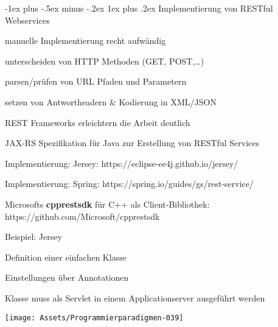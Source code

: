 \documentclass[10pt]{article}
\makeatletter
\renewcommand{\subsubsection}{\@startsection{subsubsection}{3}{0mm}%
                                {-1ex plus -.5ex minus -.2ex}%
                                {1ex plus .2ex}%
                                {\normalfont\small\bfseries}}
\makeatother
\begin{document}
\begin{itemize*}
\subsubsection{Implementierung von RESTful Webservices}
\begin{itemize*}
  \item manuelle Implementierung recht aufwändig
  \begin{itemize*}
    \item unterscheiden von HTTP Methoden (GET, POST,…)
    \item parsen/prüfen von URL Pfaden und Parametern
    \item setzen von Antwortheadern \& Kodierung in XML/JSON
  \end{itemize*}
  \item REST Frameworks erleichtern die Arbeit deutlich
  \begin{itemize*}
    \item JAX-RS Spezifikation für Java zur Erstellung von RESTful Services
    \begin{itemize*}
      \item Implementierung: Jersey: https://eclipse-ee4j.github.io/jersey/
      \item Implementierung: Spring:
      https://spring.io/guides/gs/rest-service/
    \end{itemize*}
    \item Microsofts \textbf{cpprestsdk} für C++ als Client-Bibliothek:
    https://github.com/Microsoft/cpprestsdk
  \end{itemize*}
\end{itemize*}
\begin{itemize*}
  \item Beispiel: Jersey
  \item Definition einer einfachen Klasse
  \begin{itemize*}
    \item Einstellungen über Annotationen
    \item Klasse muss als Servlet in einem Applicationserver ausgeführt werden
  \end{itemize*}
\end{itemize*}
\begin{center}
  \centering
  \texttt{[image: Assets/Programmierparadigmen-039]}
\end{center}

\end{itemize*}
\end{document}
